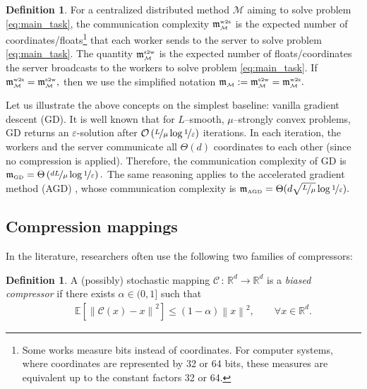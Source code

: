 \documentclass{article} %
\newcommand{\norm}[1]{\left\| #1 \right\|}
\newcommand{\R}{\mathbb{R}} %
\newcommand{\Exp}[1]{{\mathbb{E}}\left[#1\right]}
\newcommand{\cC}{\mathcal{C}}
\newcommand{\cM}{\mathcal{M}}
\newcommand{\cO}{\mathcal{O}}
\theoremstyle{plain}
\theoremstyle{definition}
\newtheorem{definition}[theorem]{Definition}
\theoremstyle{remark}
\newcommand{\eqdef}{:=}
\newcommand{\green}{\color{mydarkgreen}}
\newcommand{\algname}[1]{{\small\green\sf #1}}
\begin{document}
\begin{definition}
  \label{def:compl}
  For a centralized distributed method $\cM$ aiming to solve problem \eqref{eq:main_task}, the communication complexity $\mathfrak{m}^{{\scriptscriptstyle \textnormal{w2s}}}_{{\scriptscriptstyle \cM}}$ is the expected number of coordinates/floats\footnote{Some works measure bits instead of coordinates. For computer systems, where coordinates are represented by 32 or 64 bits, these measures are equivalent up to the constant factors 32 or 64.} that each worker sends to the server to  solve problem \eqref{eq:main_task}. The quantity $\mathfrak{m}^{{\scriptscriptstyle \textnormal{s2w}}}_{{\scriptscriptstyle \cM}}$ is the expected number of floats/coordinates the server broadcasts to the workers to solve problem \eqref{eq:main_task}. If $\mathfrak{m}^{{\scriptscriptstyle \textnormal{w2s}}}_{{\scriptscriptstyle \cM}} = \mathfrak{m}^{{\scriptscriptstyle \textnormal{s2w}}}_{{\scriptscriptstyle \cM}},$ then we use the simplified notation $\mathfrak{m}_{{\scriptscriptstyle \cM}} \eqdef \mathfrak{m}^{{\scriptscriptstyle \textnormal{s2w}}}_{{\scriptscriptstyle \cM}} = \mathfrak{m}^{{\scriptscriptstyle \textnormal{w2s}}}_{{\scriptscriptstyle \cM}}.$
\end{definition}


Let us illustrate the above concepts on the simplest baseline: vanilla gradient descent (\algname{GD}). It is well known \citep{nesterov2018lectures} that for $L$--smooth, $\mu$--strongly convex problems, \algname{GD} returns an $\varepsilon$-solution after $\cO\left(\nicefrac{L}{\mu}\log\nicefrac{1}{\varepsilon}\right)$ iterations. In each iteration, the workers and the server communicate all $\Theta(d)$ coordinates to each other (since  no compression is applied). Therefore, the communication complexity of \algname{GD} is $\mathfrak{m}_{{\scriptscriptstyle \textnormal{GD}}} = \Theta\left(\nicefrac{d L}{\mu}\log\nicefrac{1}{\varepsilon}\right).$ The same reasoning applies to the accelerated gradient method (\algname{AGD}) \citep{nesterov2018lectures}, whose communication complexity is $\mathfrak{m}_{{\scriptscriptstyle \textnormal{AGD}}} = \Theta(d \sqrt{\nicefrac{L}{\mu}}\log\nicefrac{1}{\varepsilon}).$ 


\subsection{Compression mappings}

In the literature, researchers often use the following two families of compressors:
\begin{definition}
  \label{def:biased_compression}
  A (possibly) stochastic mapping $\cC\,:\,\R^d \rightarrow \R^d$ is a \textit{biased  compressor} if
  there exists $\alpha \in (0,1]$ such that
  \begin{align}
      \label{eq:biased_compressor}
      \qquad \Exp{\norm{\cC(x) - x}^2} \leq (1 - \alpha) \norm{x}^2, \qquad \forall x \in \R^d.
  \end{align}
\end{definition}
\end{document}
